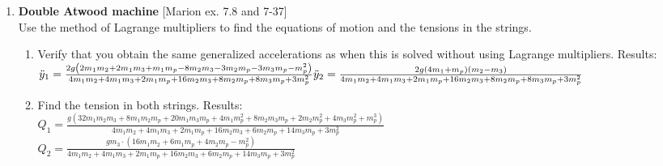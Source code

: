 \documentclass[11pt, a4paper, twoside]{article}
\begin{document}
\begin{enumerate}
	
	\item
	\begin{minipage}[t][6.5cm]{0.65\textwidth}
	\textbf{Double Atwood machine} [Marion ex. 7.8 and 7-37]\\
	Use the method of Lagrange multipliers to find the equations of motion and the tensions in the strings.
	\begin{enumerate}
		\item Verify that you obtain the same generalized accelerations as when this is solved without using Lagrange multipliers. Results:\\
		\(
			\ddot{y}_{1} = \frac{2 g \left(2 m_{1} m_{2} + 2 m_{1} m_{3} + m_{1} m_{p} - 8 m_{2} m_{3} - 3 m_{2} m_{p} - 3 m_{3} m_{p} - m_{p}^{2}\right)}{4 m_{1} m_{2} + 4 m_{1} m_{3} + 2 m_{1} m_{p} + 16 m_{2} m_{3} + 8 m_{2} m_{p} + 8 m_{3} m_{p} + 3 m_{p}^{2}}\\
			\ddot{y}_{2} = \frac{2 g \left(4 m_{1} + m_{p}\right) \left(m_{2} - m_{3}\right)}{4 m_{1} m_{2} + 4 m_{1} m_{3} + 2 m_{1} m_{p} + 16 m_{2} m_{3} + 8 m_{2} m_{p} + 8 m_{3} m_{p} + 3 m_{p}^{2}}
		\)
		\item Find the tension in both strings.
		Results:\\
		\(
			Q_{1} = \frac{g \left(32 m_{1} m_{2} m_{3} + 8 m_{1} m_{2} m_{p} + 20 m_{1} m_{3} m_{p} + 4 m_{1} m_{p}^{2} + 8 m_{2} m_{3} m_{p} + 2 m_{2} m_{p}^{2} + 4 m_{3} m_{p}^{2} + m_{p}^{3}\right)}{4 m_{1} m_{2} + 4 m_{1} m_{3} + 2 m_{1} m_{p} + 16 m_{2} m_{3} + 6 m_{2} m_{p} + 14 m_{3} m_{p} + 3 m_{p}^{2}}
			\)\\
			\(
				Q_{2} = \frac{g m_{3} \cdot \left(16 m_{1} m_{2} + 6 m_{1} m_{p} + 4 m_{2} m_{p} - m_{p}^{2}\right)}{4 m_{1} m_{2} + 4 m_{1} m_{3} + 2 m_{1} m_{p} + 16 m_{2} m_{3} + 6 m_{2} m_{p} + 14 m_{3} m_{p} + 3 m_{p}^{2}}
				\)
	\end{enumerate}
	\end{minipage}
	\begin{minipage}[c][0.5cm][t]{0.3\textwidth}
		
	\end{minipage}



\end{enumerate}
\end{document}
